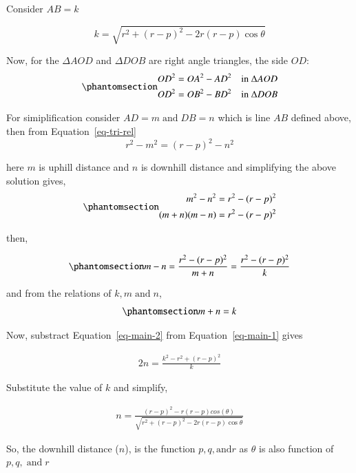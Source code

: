 \documentclass[
  number,
  preprint]{elsarticle}
\begin{document}
Consider \(AB = k\)

\[
k = \sqrt{r^2+(r-p)^2-2r(r-p)\cos\theta}
\]

Now, for the \(\Delta AOD\) and \(\Delta DOB\) are right angle
triangles, the side \(OD\):
\begin{equation}\protect\phantomsection\label{eq-tri-rel}{
\begin{aligned}
OD^2 = OA^2 - AD^2 \quad \text{in } \Delta AOD \\
OD^2 = OB^2 - BD^2 \quad \text{in } \Delta DOB
\end{aligned}
}\end{equation}

For simiplification consider \(AD = m \; \text{and} \; DB = n\) which is
line \(AB\) defined above, then from Equation~\ref{eq-tri-rel} \[
r^2 - m^2 = (r-p)^2 - n^2
\]

here \(m\) is uphill distance and \(n\) is downhill distance and
simplifying the above solution gives,
\begin{equation}\protect\phantomsection\label{eq-main}{
\begin{aligned}
m^2 - n^2 = r^2 - (r-p)^2 \\
(m+n)(m-n) = r^2 - (r-p)^2
\end{aligned}
}\end{equation}

then,

\begin{equation}\protect\phantomsection\label{eq-main-2}{
m-n = \frac{r^2 - (r-p)^2}{m+n} = \frac{r^2 - (r-p)^2}{k} 
}\end{equation}

and from the relations of \(k, m \; \text{and} \; n\),
\begin{equation}\protect\phantomsection\label{eq-main-1}{
m + n = k
}\end{equation}

Now, substract Equation~\ref{eq-main-2} from Equation~\ref{eq-main-1}
gives

\[
\begin{aligned}
2n = \frac{k^2 - r^2 + (r-p)^2}{k}
\end{aligned}
\]

Substitute the value of \(k\) and simplify,

\[
\begin{aligned}
n = \frac{(r-p)^2 - r(r-p) cos(\theta)}{\sqrt{r^2+(r-p)^2-2r(r-p)\cos\theta}}
\end{aligned}
\]

So, the downhill distance (\(n\)), is the function
\(p, q, \text{and} r\) as \(\theta\) is also function of
\(p, q, \; \text{and} \; r\)
\end{document}
